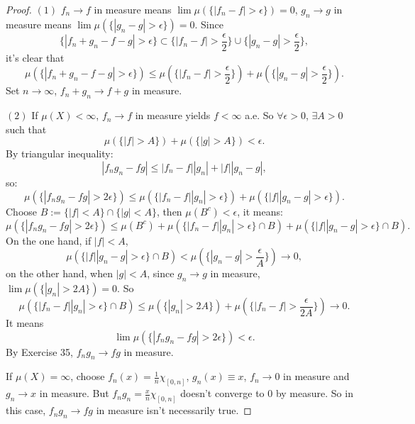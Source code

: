 \documentclass{article}
\begin{document}
\begin{proof}
    $(1)$ $f_{n}\rightarrow f$ in measure means $\lim\mu(\{|f_n-f|>\epsilon\})=0$, 
    $g_{n}\rightarrow g$ in measure means $\lim\mu(\{|g_n-g|>\epsilon\})=0$. 
    Since 
    \begin{displaymath}
        \{|f_{n}+g_n-f-g|> \epsilon\}\subset
        \{|f_{n}-f|>\frac{\epsilon}{2}\}\cup\{|g_n-g|>\frac{\epsilon}{2}\},
    \end{displaymath}
    it's clear that 
    \begin{displaymath}
        \mu(\{|f_n+g_n-f-g|>\epsilon\})
        \le\mu(\{|f_n-f|>\frac{\epsilon}{2}\})
        +\mu(\{|g_n-g|>\frac{\epsilon}{2}\}).
    \end{displaymath}
    Set $n\rightarrow\infty$, $f_{n}+g_n\rightarrow f+g$ in measure.

    $(2)$ If $\mu(X)<\infty$, $f_{n}\rightarrow f$ in measure 
    yields $f<\infty$ a.e. 
    So $\forall\epsilon>0$, $\exists A>0$ such that 
    \begin{displaymath}
        \mu(\{|f|>A\})+\mu(\{|g|>A\})<\epsilon.
    \end{displaymath}
    By triangular inequality:
    \begin{displaymath}
        |f_{n}g_n-fg|\le|f_n-f||g_n|+|f||g_n-g|,
    \end{displaymath}
    so:
    \begin{displaymath}
        \mu(\{|f_ng_n-fg|>2\epsilon\})\le\mu(\{|f_n-f||g_n|>\epsilon\})
        +\mu(\{|f||g_n-g|>\epsilon\}).
    \end{displaymath}
    Choose $B:=\{|f|<A\}\cap\{|g|<A\}$, then $\mu(B^c)<\epsilon$, it means:
    \begin{displaymath}
        \mu(\{|f_ng_n-fg|>2\epsilon\})\le
        \mu(B^{c})+\mu(\{|f_{n}-f||g_n|>\epsilon\}\cap B)
        +\mu(\{|f||g_n-g|>\epsilon\}\cap B).
    \end{displaymath}
    On the one hand, if $|f|<A$, 
    \begin{displaymath}
        \mu(\{|f||g_n-g|>\epsilon\}\cap B)<\mu(\{|g_n-g|
        >\frac{\epsilon}{A}\})
        \rightarrow 0,
    \end{displaymath}
    on the other hand, when $|g|<A$, 
    since $g_n\rightarrow g$ in measure, 
    $\lim\mu(\{|g_n|>2A\})=0$. So 
    \begin{displaymath}
        \mu(\{|f_n-f||g_n|>\epsilon\}\cap B)
        \le\mu(\{|g_n|>2A\})
        +\mu(\{|f_n-f|>\frac{\epsilon}{2A}\})\rightarrow 0.
    \end{displaymath}
    It means 
    \begin{displaymath}
        \lim\mu(\{|f_ng_n-fg|>2\epsilon\})<\epsilon.
    \end{displaymath}
    By Exercise 35, $f_ng_n\rightarrow fg$ in measure.

    If $\mu(X)=\infty$, choose $f_{n}(x)=\frac{1}{n}\chi_{[0,n]}$, 
    $g_{n}(x)\equiv x$, $f_n\rightarrow 0$ in measure and $g_n\rightarrow x$ in measure. 
    But $f_ng_n=\frac{x}{n}\chi_{[0,n]}$ doesn't converge to $0$ by measure. 
    So in this case, $f_ng_n\rightarrow fg$ in measure isn't necessarily true.
\end{proof}
\end{document}
